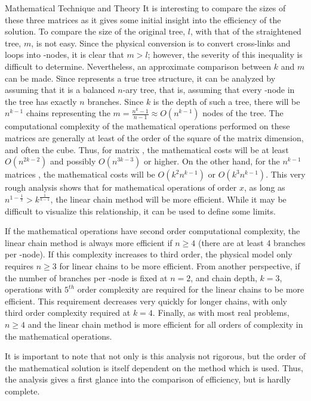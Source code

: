 \begin{chapter}{Mathematical Technique and Theory\label{chap:math}}
  It is interesting to compare the sizes of these three matrices as it
  gives some initial insight into the efficiency of the solution.  To
  compare the size of the original tree, $l$, with that of the
  straightened tree, $m$, is not easy.  Since the physical conversion
  is to convert cross-links and loops into \pc-nodes, it is clear that
  $m > l$; however, the severity of this inequality is difficult to
  determine.  Nevertheless, an approximate comparison between $k$ and
  $m$ can be made.  Since  represents a true tree structure, it
  can be analyzed by assuming that it is a balanced $n$-ary tree, that
  is, assuming that every \pc-node in the tree has exactly $n$
  branches.  Since $k$ is the depth of such a tree, there will be
  $n^{k-1}$ chains representing the $m = \frac{n^k -1}{n-1} \approx
  O(n^{k-1})$ nodes of the tree.  The computational complexity of the
  mathematical operations performed on these matrices are generally at
  least of the order of the square of the matrix dimension, and often
  the cube.  Thus, for matrix , the mathematical costs will be
  at least $O(n^{2k-2})$ and possibly $O(n^{3k-3})$ or higher.  On the
  other hand, for the $n^{k-1}$ matrices , the mathematical
  costs will be $O(k^2n^{k-1})$ or $O(k^3n^{k-1})$.  This very rough
  analysis shows that for mathematical operations of order $x$, as
  long as $n^{1-\frac{1}{x}} > k^{\frac{1}{k-1}}$, the linear chain
  method will be more efficient.  While it may be difficult to
  visualize this relationship, it can be used to define some limits.
  
  If the mathematical operations have second order computational
  complexity, the linear chain method is always more efficient if $n
  \geq 4$ (there are at least 4 branches per \pc-node).  If this
  complexity increases to third order, the physical model only
  requires $n \geq 3$ for linear chains to be more efficient.  From
  another perspective, if the number of branches per \pc-node is fixed
  at $n = 2$, and chain depth, $k = 3$, operations with $5^{th}$ order
  complexity are required for the linear chains to be more efficient.
  This requirement decreases very quickly for longer chains, with only
  third order complexity required at $k = 4$.  Finally, as with most
  real problems, $n \geq 4$ and the linear chain method is more
  efficient for all orders of complexity in the mathematical
  operations.
  
  It is important to note that not only is this analysis not rigorous,
  but the order of the mathematical solution is itself dependent on
  the method which is used.  Thus, the analysis gives a first glance
  into the comparison of efficiency, but is hardly complete.
  

\end{chapter}
